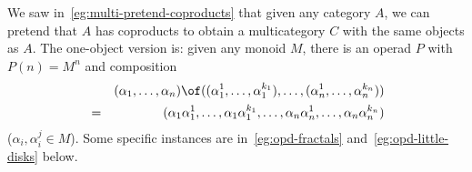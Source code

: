 \begin{example}	
We saw in~\ref{eg:multi-pretend-coproducts} that given any category $A$, we
can pretend that $A$ has coproducts%
%
%
to obtain a multicategory $C$ with the
same objects as $A$.  The one-object version is: given any monoid $M$,
there is an operad $P$ with $P(n) = M^n$ and composition
%
\begin{eqnarray*}
&&
(\alpha_1, \ldots, \alpha_n) \of 
((\alpha_1^1, \ldots, \alpha_1^{k_1}), \ldots, 
(\alpha_n^1, \ldots,  \alpha_n^{k_n}))\\
&=&
(\alpha_1 \alpha_1^1, \ldots, \alpha_1 \alpha_1^{k_1}, \ldots,
\alpha_n \alpha_n^1, \ldots, \alpha_n \alpha_n^{k_n})
\end{eqnarray*}
%
($\alpha_i, \alpha_i^j \in M$).  Some specific instances are
in~\ref{eg:opd-fractals} and~\ref{eg:opd-little-disks} below.
\end{example}

